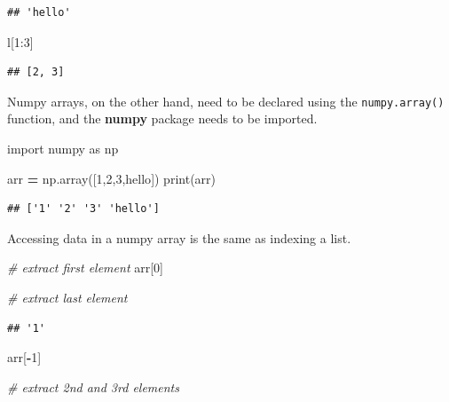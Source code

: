 \documentclass[
]{book}
\newenvironment{Shaded}{\begin{snugshade}}{\end{snugshade}}
\newcommand{\BuiltInTok}[1]{#1}
\newcommand{\CommentTok}[1]{\textcolor[rgb]{0.56,0.35,0.01}{\textit{#1}}}
\newcommand{\DecValTok}[1]{\textcolor[rgb]{0.00,0.00,0.81}{#1}}
\newcommand{\ImportTok}[1]{#1}
\newcommand{\NormalTok}[1]{#1}
\newcommand{\OperatorTok}[1]{\textcolor[rgb]{0.81,0.36,0.00}{\textbf{#1}}}
\newcommand{\StringTok}[1]{\textcolor[rgb]{0.31,0.60,0.02}{#1}}
\begin{document}
\begin{verbatim}
## 'hello'
\end{verbatim}

\begin{Shaded}
\begin{Highlighting}[]
\NormalTok{l[}\DecValTok{1}\NormalTok{:}\DecValTok{3}\NormalTok{]}
\end{Highlighting}
\end{Shaded}

\begin{verbatim}
## [2, 3]
\end{verbatim}

Numpy arrays, on the other hand, need to be declared using the \texttt{numpy.array()} function, and the \textbf{numpy} package needs to be imported.

\begin{Shaded}
\begin{Highlighting}[]
\ImportTok{import}\NormalTok{ numpy }\ImportTok{as}\NormalTok{ np}

\NormalTok{arr }\OperatorTok{=}\NormalTok{ np.array([}\DecValTok{1}\NormalTok{,}\DecValTok{2}\NormalTok{,}\DecValTok{3}\NormalTok{,}\StringTok{\textquotesingle{}hello\textquotesingle{}}\NormalTok{])}
\BuiltInTok{print}\NormalTok{(arr)}
\end{Highlighting}
\end{Shaded}

\begin{verbatim}
## ['1' '2' '3' 'hello']
\end{verbatim}

Accessing data in a numpy array is the same as indexing a list.

\begin{Shaded}
\begin{Highlighting}[]
\CommentTok{\# extract first element }
\NormalTok{arr[}\DecValTok{0}\NormalTok{]}

\CommentTok{\# extract last element}
\end{Highlighting}
\end{Shaded}

\begin{verbatim}
## '1'
\end{verbatim}

\begin{Shaded}
\begin{Highlighting}[]
\NormalTok{arr[}\OperatorTok{{-}}\DecValTok{1}\NormalTok{]}

\CommentTok{\# extract 2nd and 3rd elements}
\end{Highlighting}
\end{Shaded}
\end{document}
